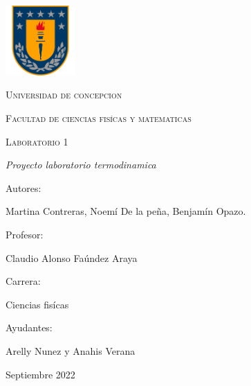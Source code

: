 \documentclass[a4paper, 12p]{article}
\begin{document}
\begin{titlepage}
      \begin{center}     
              
            \includegraphics[width=0.2\textwidth]{graficos/escudo_udec.png}                       %
            
            
            
            \vspace{1cm}
            \textsc{{\LARGE Universidad de concepcion}}
            
            \vspace{1cm}
            {\scshape\Large Facultad de ciencias fisícas y matematicas \par}
            \vspace{2cm}
            {\scshape\Huge Laboratorio 1 \par}
            \vspace{2cm}
            {\itshape\Large Proyecto laboratorio termodinamica \par}
            \vfill
            {\Large Autores: \par}
            {\Large Martina Contreras, Noemí De la peña, Benjamín Opazo. \par}
            \vfill
            \vfill
            {\Large Profesor: \par}
            {\Large Claudio Alonso Faúndez Araya \par}
            \vfill
            \vfill
            {\Large Carrera: \par}
            {\Large Ciencias fisícas \par}
            \vfill
            \vfill
            {\Large Ayudantes: \par}
            {\Large Arelly Nunez y Anahis Verana \par}
            \vfill
            {\Large Septiembre 2022 \par}
      \end{center}
\end{titlepage}            
\end{document}
